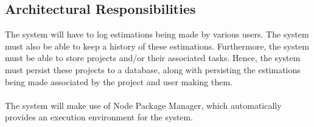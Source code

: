 \subsection{Architectural Responsibilities}
The system will have to log estimations being made by various users. The system must also be able to keep a history of these estimations. Furthermore, the system must be able to store projects and/or their associated tasks. Hence, the system must persist these projects to a database, along with persisting the estimations being made associated by the project and user making them. \\ \\
The system will make use of Node Package Manager, which automatically provides an execution environment for the system.